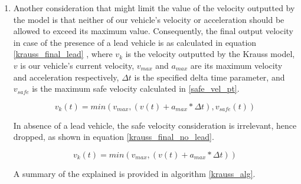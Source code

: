 \begin{enumerate}
    \begin{equation}
        d(v_f) + v_f\tau \leq d(v_l) + g
        \label{krauss_inequal}
    \end{equation}
    
    Assuming both vehicles use their maximum deceleration, \(b_{max}\), in order to halt, equation \ref{krauss_inequal} can be re-written as equation \ref{krauss_quadr}, and solved for the maximum \(v_f\) which resembles the maximum possible safe velocity with respect to the lead vehicle.
    
    \begin{equation}
        \frac{v_f^2}{2b_{f_{max}}} + v_f\tau \leq \frac{v_l^2}{2b_{l_{max}}} + g
        \label{krauss_quadr}
    \end{equation}
    \label{safe_vel_pt}
    
    \item Another consideration that might limit the value of the velocity outputted by the model is that neither of our vehicle’s velocity or acceleration should be allowed to exceed its maximum value. Consequently, the final output velocity in case of the presence of a lead vehicle is as calculated in equation \ref{krauss_final_lead} \cite{Krau1998MicroscopicMO}, where \(v_k\) is the velocity outputted by the Krauss model, \(v\) is our vehicle's current velocity, \(v_{max}\) and \(a_{max}\) are its maximum velocity and acceleration respectively, \(\Delta t\) is the specified delta time parameter, and \(v_{safe}\) is the maximum safe velocity calculated in \ref{safe_vel_pt}.

    \begin{equation}
        v_k(t) = min(v_{max}, (v(t) + a_{max}*\Delta t), v_{safe}(t))
        \label{krauss_final_lead}
    \end{equation}
    
    In absence of a lead vehicle, the safe velocity consideration is irrelevant, hence dropped, as shown in equation \ref{krauss_final_no_lead}.

    \begin{equation}
        v_k(t) = min(v_{max}, (v(t) + a_{max}*\Delta t))
        \label{krauss_final_no_lead}
    \end{equation}
    
    A summary of the explained is provided in algorithm \ref{krauss_alg}.


\end{enumerate}
